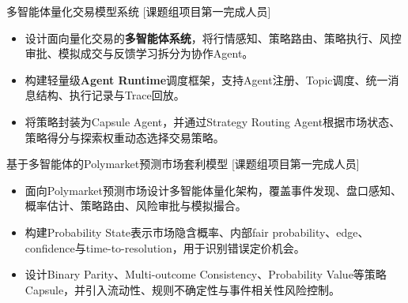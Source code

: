 \documentclass{resume}
\begin{document}
\ResumeItem
{多智能体量化交易模型系统}
[课题组项目第一完成人员]
\begin{itemize}
  \item 设计面向量化交易的\textbf{多智能体系统}，将行情感知、策略路由、策略执行、风控审批、模拟成交与反馈学习拆分为协作Agent。
  \item 构建轻量级\textbf{Agent Runtime}调度框架，支持Agent注册、Topic调度、统一消息结构、执行记录与Trace回放。
  \item 将策略封装为Capsule Agent，并通过Strategy Routing Agent根据市场状态、策略得分与探索权重动态选择交易策略。
\end{itemize}

\ResumeItem
{基于多智能体的Polymarket预测市场套利模型}
[课题组项目第一完成人员]
\begin{itemize}
  \item 面向Polymarket预测市场设计多智能体量化架构，覆盖事件发现、盘口感知、概率估计、策略路由、风险审批与模拟撮合。
  \item 构建Probability State表示市场隐含概率、内部fair probability、edge、confidence与time-to-resolution，用于识别错误定价机会。
  \item 设计Binary Parity、Multi-outcome Consistency、Probability Value等策略Capsule，并引入流动性、规则不确定性与事件相关性风险控制。
\end{itemize}
\end{document}
